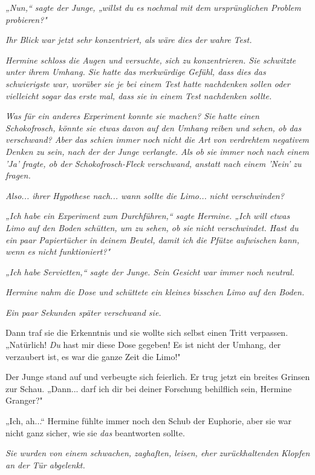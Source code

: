 {\emph{„Nun,“ sagte der Junge, „willst du es nochmal mit dem ursprünglichen Problem probieren?"}

\emph{Ihr Blick war jetzt sehr konzentriert, als wäre dies der} \emph{\emph{wahre}} \emph{Test.}

\emph{Hermine schloss die Augen und versuchte, sich zu konzentrieren. Sie schwitzte unter ihrem Umhang. Sie hatte das merkwürdige Gefühl, dass dies das schwierigste war, worüber sie je bei einem Test hatte nachdenken sollen oder vielleicht sogar das} \emph{\emph{erste}} \emph{mal, dass sie in einem Test nachdenken sollte.}

\emph{Was für ein anderes Experiment konnte sie machen? Sie hatte einen Schokofrosch, könnte sie etwas davon auf den Umhang reiben und sehen, ob} \emph{\emph{das}} \emph{verschwand? Aber das schien immer noch nicht die Art von verdrehtem negativem Denken zu sein, nach der der Junge verlangte. Als ob sie immer noch nach einem 'Ja' fragte, ob der Schokofrosch-Fleck verschwand, anstatt nach einem 'Nein' zu fragen.}

\emph{Also... ihrer Hypothese nach... wann sollte die Limo...} \emph{\emph{nicht}} \emph{verschwinden?}

\emph{„Ich habe ein Experiment zum Durchführen,“ sagte Hermine. „Ich will etwas Limo auf den Boden schütten, um zu sehen, ob sie} \emph{\emph{nicht}} \emph{verschwindet. Hast du ein paar Papiertücher in deinem Beutel, damit ich die Pfütze aufwischen kann, wenn es nicht funktioniert?"}

\emph{„Ich habe Servietten,“ sagte der Junge. Sein Gesicht war immer noch neutral.}

\emph{Hermine nahm die Dose und schüttete ein kleines bisschen Limo auf den Boden.}

\emph{Ein paar Sekunden später verschwand sie.}

Dann traf sie die Erkenntnis und sie wollte sich selbst einen Tritt verpassen. „Natürlich! \emph{Du} hast mir diese Dose gegeben! Es ist nicht der Umhang, der verzaubert ist, es war die ganze Zeit die Limo!"

Der Junge stand auf und verbeugte sich feierlich. Er trug jetzt ein breites Grinsen zur Schau. „Dann... darf ich dir bei deiner Forschung behilflich sein, Hermine Granger?"

„Ich, ah...“ Hermine fühlte immer noch den Schub der Euphorie, aber sie war nicht ganz sicher, wie sie \emph{das} beantworten sollte.

\emph{Sie wurden von einem schwachen, zaghaften, leisen, eher} \emph{\emph{zurückhaltenden}} \emph{Klopfen an der Tür abgelenkt.}

}
